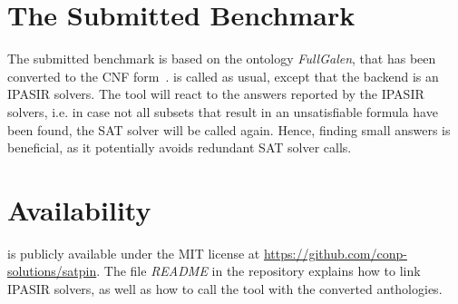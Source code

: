\documentclass[conference]{IEEEtran}
\begin{document}
\newpage

\section{The Submitted Benchmark}

The submitted benchmark is based on the ontology \emph{FullGalen}, that has been converted to the CNF form~\cite{SeVe15}.
\satpin is called as usual, except that the backend is an IPASIR solvers.
The tool will react to the answers reported by the IPASIR solvers, i.e. in case not all subsets that result in an unsatisfiable formula have been found, the SAT solver will be called again.
Hence, finding small answers is beneficial, as it potentially avoids redundant SAT solver calls.

\section{Availability}

\satpin is publicly available under the MIT license at \url{https://github.com/conp-solutions/satpin}.
The file \emph{README} in the repository explains how to link IPASIR solvers, as well as how to call the tool with the converted anthologies.




\end{document}
